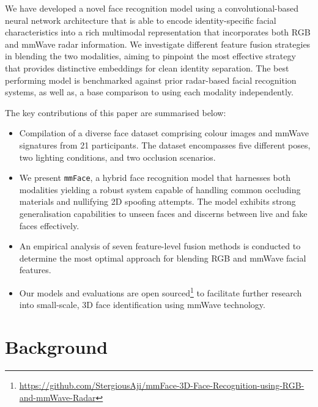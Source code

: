 \documentclass{mpaper}
\begin{document}
We have developed a novel face recognition model using a convolutional-based neural network architecture that is able to encode identity-specific facial characteristics into a rich multimodal representation that incorporates both RGB and mmWave radar information. We investigate different feature fusion strategies in blending the two modalities, aiming to pinpoint the most effective strategy that provides distinctive embeddings for clean identity separation. The best performing model is benchmarked against prior radar-based facial recognition systems, as well as, a base comparison to using each modality independently.

The key contributions of this paper are summarised below:
\vspace{-0.48cm}
\begin{itemize}
    \itemsep 0.08cm
    \item Compilation of a diverse face dataset comprising colour images and mmWave signatures from 21 participants. The dataset encompasses five different poses, two lighting conditions, and two occlusion scenarios.
    \item We present \texttt{mmFace}, a hybrid face recognition model that harnesses both modalities yielding a robust system capable of handling common occluding materials and nullifying 2D spoofing attempts. The model exhibits strong generalisation capabilities to unseen faces and discerns between live and fake faces effectively.
    \item An empirical analysis of seven feature-level fusion methods is conducted to determine the most optimal approach for blending RGB and mmWave facial features.
    \item Our models and evaluations are open sourced\footnote{\url{https://github.com/StergiousAji/mmFace-3D-Face-Recognition-using-RGB-and-mmWave-Radar}} to facilitate further research into small-scale, 3D face identification using mmWave technology.
\end{itemize}
\vspace{0.01cm}



\section{Background}
\end{document}
